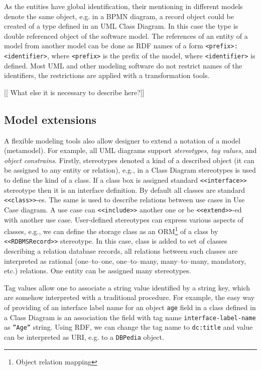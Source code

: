 \documentclass[conference]{IEEEtran}
\begin{document}
As the entities have global identification, their mentioning in different models denote the same object, e.g. in a BPMN diagram, a record object could be created of a type defined in an UML Class Diagram.  In this case the type is double referenced object of the software model.  The references of an entity of a model from another model can be done as RDF names of a form \texttt{<prefix>:<identifier>}, where \texttt{<prefix>} is the prefix of the model, where \texttt{<identifier>} is defined.  Most UML and other modeling software do not restrict names of the identifiers, the restrictions are applied with a transformation tools.

[[ What else it is necessary to describe here?]]

\subsection{Model extensions}
\label{sec:mod-ext}

A flexible modeling tools also allow designer to extend a notation of a model (metamodel).  For example, all UML diagrams support \emph{stereotypes}, \emph{tag values}, and \emph{object constrains}.  Firstly, stereotypes denoted a kind of a described object (it can be assigned to any entity or relation), e.g., in a Class Diagram stereotypes is used to define the kind of a class.  If a class box is assigned standard \texttt{<<interface>>} stereotype then it is an interface definition.  By default all classes are standard \texttt{<<class>>}-es.  The same is used to describe relations between use cases in Use Case diagram.  A use case can \texttt{<<include>>} another one or be \texttt{<<extend>>}-ed with another use case.  User-defined stereotypes can express various aspects of classes, e.g., we can define the storage class as an ORM\footnote{Object relation mapping} of a class by \texttt{<<RDBMSRecord>>} stereotype.  In this case, class is added to set of classes describing a relation database records, all relations between such classes are interpreted as rational (one--to--one, one--to--many, many--to--many, mandatory, etc.) relations.  One entity can be assigned many stereotypes.

Tag values allow one to associate a string value identified by a string key, which are somehow interpreted with a traditional procedure.  For example, the easy way of providing of an interface label name for an object \texttt{age} field in a class defined in a Class Diagram is an association the field with tag name \texttt{interface-label-name} as \texttt{''Age''} string.  Using RDF, we can change the tag name to \texttt{dc:title} and value can be interpreted as URI, e.g. to a \texttt{DBPedia} object.
\end{document}
